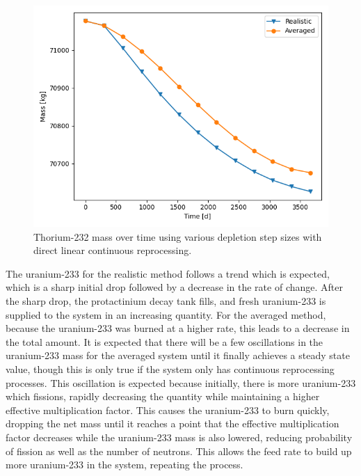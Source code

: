 \begin{figure}[H]
  \centering
  \includegraphics[scale=0.5]{images/adv-Th232.png}
  \caption{Thorium-232 mass over time using various depletion step sizes with direct linear continuous reprocessing.}
   \label{fig:DL-cont-th-adv}
\end{figure}

The uranium-233 for the realistic method follows a trend which is expected, which is a sharp initial drop followed by a decrease in the rate of change. After the sharp drop, the protactinium decay tank fills, and fresh uranium-233 is supplied to the system in an increasing quantity. For the averaged method, because the uranium-233 was burned at a higher rate, this leads to a decrease in the total amount. It is expected that there will be a few oscillations in the uranium-233 mass for the averaged system until it finally achieves a steady state value, though this is only true if the system only has continuous reprocessing processes. This oscillation is expected because initially, there is more uranium-233 which fissions, rapidly decreasing the quantity while maintaining a higher effective multiplication factor. This causes the uranium-233 to burn quickly, dropping the net mass until it reaches a point that the effective multiplication factor decreases while the uranium-233 mass is also lowered, reducing probability of fission as well as the number of neutrons. This allows the feed rate to build up more uranium-233 in the system, repeating the process.

